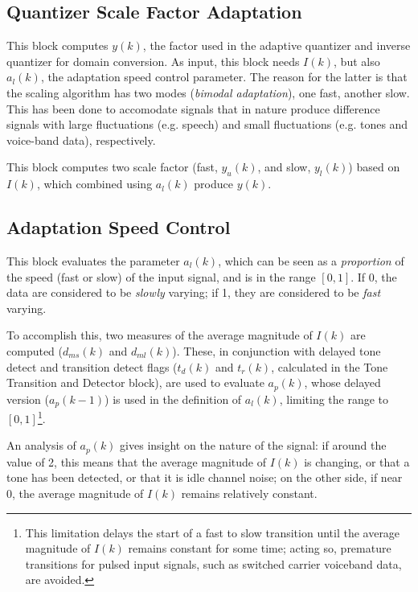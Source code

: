 \subsection{Quantizer Scale Factor Adaptation}

This block computes $y(k)$, the factor used in the adaptive quantizer
and inverse quantizer for domain conversion. As input, this block
needs $I(k)$, but also $a_l(k)$, the adaptation speed control
parameter. The reason for the latter is that the scaling algorithm
has two modes ({\em bimodal adaptation}), one fast, another slow.
This has been done to accomodate signals that in nature produce
difference signals with large fluctuations (e.g. speech) and small
fluctuations (e.g. tones and voice-band data), respectively.

This block computes two scale factor (fast, $y_u(k)$, and slow,
$y_l(k)$) based on $I(k)$, which combined using $a_l(k)$ produce
$y(k)$.


\subsection{Adaptation Speed Control}

This block evaluates the parameter $a_l(k)$, which can be seen as a
{\em proportion} of the speed (fast or slow) of the input signal, and
is in the range $[0,1]$. If 0, the data are considered to be {\em
slowly} varying; if 1, they are considered to be {\em fast}
varying.

To accomplish this, two measures of the average magnitude of $I(k)$ are
computed ($d_{ms}(k)$ and $d_{ml}(k)$). These, in conjunction with
delayed tone detect and transition detect flags ($t_d(k)$ and $t_r(k)$,
calculated in the Tone Transition and Detector block), are used to
evaluate $a_p(k)$, whose delayed version ($a_p(k-1)$) is used in the
definition of $a_l(k)$, limiting the range to $[0,1]$\footnote{\SF This
limitation delays the start of a fast to slow transition until the
average magnitude of $I(k)$ remains constant for some time; acting so,
premature transitions for pulsed input signals, such as switched
carrier voiceband data, are avoided.}.

An analysis of $a_p(k)$ gives insight on the nature of the signal: if
around the value of 2, this means that the average magnitude of $I(k)$
is changing, or that a tone has been detected, or that it is idle
channel noise; on the other side, if near 0, the average magnitude of
$I(k)$ remains relatively constant.


